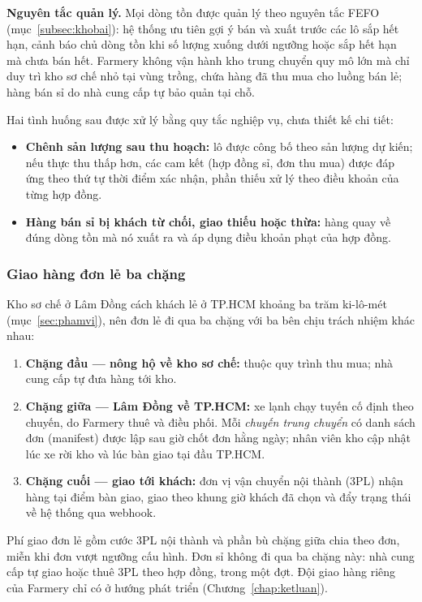 \noindent\textbf{Nguyên tắc quản lý.} Mọi dòng tồn được quản lý theo nguyên tắc FEFO (mục~\ref{subsec:khobai}): hệ thống ưu tiên gợi ý bán và xuất trước các lô sắp hết hạn, cảnh báo chủ dòng tồn khi số lượng xuống dưới ngưỡng hoặc sắp hết hạn mà chưa bán hết. Farmery không vận hành kho trung chuyển quy mô lớn mà chỉ duy trì kho sơ chế nhỏ tại vùng trồng, chứa hàng đã thu mua cho luồng bán lẻ; hàng bán sỉ do nhà cung cấp tự bảo quản tại chỗ.

Hai tình huống sau được xử lý bằng quy tắc nghiệp vụ, chưa thiết kế chi tiết:
\begin{itemize}
    \item \textbf{Chênh sản lượng sau thu hoạch:} lô được công bố theo sản lượng dự kiến; nếu thực thu thấp hơn, các cam kết (hợp đồng sỉ, đơn thu mua) được đáp ứng theo thứ tự thời điểm xác nhận, phần thiếu xử lý theo điều khoản của từng hợp đồng.
    \item \textbf{Hàng bán sỉ bị khách từ chối, giao thiếu hoặc thừa:} hàng quay về đúng dòng tồn mà nó xuất ra và áp dụng điều khoản phạt của hợp đồng.
\end{itemize}

\subsubsection*{Giao hàng đơn lẻ ba chặng}
Kho sơ chế ở Lâm Đồng cách khách lẻ ở TP.HCM khoảng ba trăm ki-lô-mét (mục~\ref{sec:phamvi}), nên đơn lẻ đi qua ba chặng với ba bên chịu trách nhiệm khác nhau:
\begin{enumerate}
    \item \textbf{Chặng đầu --- nông hộ về kho sơ chế:} thuộc quy trình thu mua; nhà cung cấp tự đưa hàng tới kho.
    \item \textbf{Chặng giữa --- Lâm Đồng về TP.HCM:} xe lạnh chạy tuyến cố định theo chuyến, do Farmery thuê và điều phối. Mỗi \emph{chuyến trung chuyển} có danh sách đơn (manifest) được lập sau giờ chốt đơn hằng ngày; nhân viên kho cập nhật lúc xe rời kho và lúc bàn giao tại đầu TP.HCM.
    \item \textbf{Chặng cuối --- giao tới khách:} đơn vị vận chuyển nội thành (3PL) nhận hàng tại điểm bàn giao, giao theo khung giờ khách đã chọn và đẩy trạng thái về hệ thống qua webhook.
\end{enumerate}
Phí giao đơn lẻ gồm cước 3PL nội thành và phần bù chặng giữa chia theo đơn, miễn khi đơn vượt ngưỡng cấu hình. Đơn sỉ không đi qua ba chặng này: nhà cung cấp tự giao hoặc thuê 3PL theo hợp đồng, trong một đợt. Đội giao hàng riêng của Farmery chỉ có ở hướng phát triển (Chương~\ref{chap:ketluan}).

